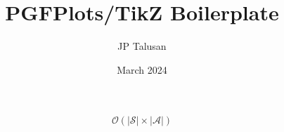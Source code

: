 \documentclass[conference]{IEEEtran}
\title{PGFPlots/TikZ Boilerplate}
\author{JP Talusan}
\date{March 2024}
\DeclareMathOperator*{\argmaxA}{arg\,max} %
\DeclareMathOperator*{\maxA}{max} %
\begin{document}
\maketitle


































\begin{equation}
    \mathcal{O}(|\mathcal{S}| \times |\mathcal{A}|)
\end{equation}

% 
\end{document}

